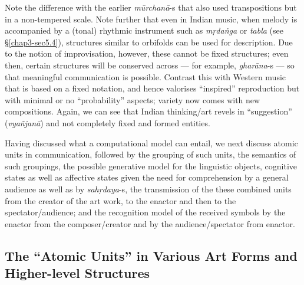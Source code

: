 Note the difference with the earlier \textsl{mūrchanā}-s that also used transpositions but in a non-tempered scale. Note further that even in Indian music, when melody is accompanied by a (tonal) rhythmic instrument such as \textsl{mṛdaṅga} or \textsl{tabla}
 (see \S\ref{chap3-sec5.4}), structures similar to orbifolds can be used for description. Due to the notion of improvisation, however, these cannot be fixed structures; even then, certain structures will be conserved across --- for example, \hbox{\textsl{gharāna}-s} --- so that meaningful communication is possible. Contrast this with Western music that is based on a fixed notation, and hence valorises “inspired” reproduction but with minimal or no “probability” aspects; variety now comes with new compositions. Again, we can see that Indian thinking/art revels in “suggestion” (\textsl{vyañjanā}) and not completely fixed and formed entities.

Having discussed what a computational model can entail, we next discuss atomic units in communication, followed by the grouping of such units, the semantics of such groupings, the possible generative model for the linguistic objects, cognitive states as well as affective states given the need for comprehension by a general audience as well as by \textsl{sahṛdaya}-s, the transmission of the these combined units from the creator of the art work, to the enactor and then to the spectator/audience; and the recognition model of the received symbols by the enactor from the composer/creator and by the audience/spectator from enactor.\\[-21pt]

\subsection{The “Atomic Units” in Various Art Forms and Higher-level Structures}\label{chap3-sec4.1}

